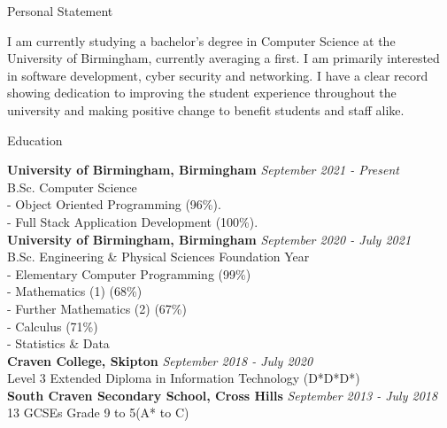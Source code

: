 \documentclass{resume} %
\begin{document}

\begin{rSection}{Personal Statement}

I am currently studying a bachelor's degree in Computer Science at the University of Birmingham, currently averaging a first. I am primarily interested in software development, cyber security and networking. I have a clear record showing dedication to improving the student experience throughout the university and making positive change to benefit students and staff alike. 

\end{rSection}




\begin{rSection}{Education}

{\bf University of Birmingham, Birmingham} \hfill {\em September 2021 - Present} \\ 
B.Sc. Computer Science\\
- Object Oriented Programming (96\%).\\
- Full Stack Application Development (100\%).\\

{\bf University of Birmingham, Birmingham} \hfill {\em September 2020 - July 2021} \\ 
B.Sc. Engineering \& Physical Sciences Foundation Year\\
- Elementary Computer Programming (99\%) \\
- Mathematics (1) (68\%)\\
- Further Mathematics (2) (67\%)\\
- Calculus (71\%)\\
- Statistics \& Data\\

{\bf Craven College, Skipton} \hfill {\em September 2018 - July 2020} \\
Level 3 Extended Diploma in Information Technology (D*D*D*) \\

{\bf South Craven Secondary School, Cross Hills} \hfill {\em September 2013 - July 2018} \\
13 GCSEs Grade 9 to 5(A* to C)

\end{rSection}
\end{document}
